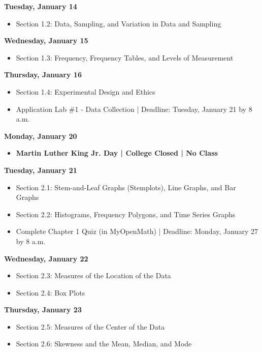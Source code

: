 \documentclass[11pt]{article}
\begin{document}
\textbf{Tuesday, January 14}

\begin{itemize}
\item Section 1.2: Data, Sampling, and Variation in Data and Sampling
\end{itemize}

\textbf{Wednesday, January 15}

\begin{itemize}
\item Section 1.3: Frequency, Frequency Tables, and Levels of Measurement
\end{itemize}

\textbf{Thursday, January 16}

\begin{itemize}
\item Section 1.4: Experimental Design and Ethics
\item Application Lab \#1 - Data Collection | Deadline: Tuesday, January 21 by 8 a.m.
\end{itemize}

\textbf{Monday, January 20}

\begin{itemize}
\item \textbf{Martin Luther King Jr. Day | College Closed | No Class}
\end{itemize}

\textbf{Tuesday, January 21}

\begin{itemize}
\item Section 2.1: Stem-and-Leaf Graphs (Stemplots), Line Graphs, and Bar Graphs
\item Section 2.2: Histograms, Frequency Polygons, and Time Series Graphs
\item Complete Chapter 1 Quiz (in MyOpenMath) | Deadline: Monday, January 27 by 8 a.m.
\end{itemize}

\textbf{Wednesday, January 22}

\begin{itemize}
\item Section 2.3: Measures of the Location of the Data
\item Section 2.4: Box Plots
\end{itemize}

\textbf{Thursday, January 23}

\begin{itemize}
\item Section 2.5: Measures of the Center of the Data
\item Section 2.6: Skewness and the Mean, Median, and Mode
\end{itemize}
\end{document}
